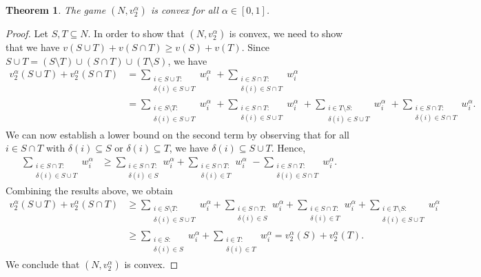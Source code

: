 \documentclass[10p]{article}
\newtheorem{theorem}{Theorem}
\theoremstyle{definition}
\theoremstyle{definition}
\begin{document}
\begin{theorem}%
The game $(N,v_2^\alpha)$ is convex for all $\alpha \in [0,1]$.
\end{theorem}
\begin{proof}
Let $S, T \subseteq N$. In order to show that $(N,v_2^\alpha)$ is convex, we need to show that we have $v(S \cup T) + v(S \cap T) \geq v(S) + v(T)$. Since $S \cup T = (S \setminus T) \cup (S \cap T) \cup (T \setminus S)$, we have
\begin{align*}
    v_2^\alpha(S \cup T) + v_2^\alpha(S \cap T) & = \sum_{\substack{i \in S \cup T : \\ \delta(i) \in S \cup T}}w_i^\alpha \,\, + \sum_{\substack{i \in S \cap T : \\ \delta(i) \in S \cap T}}w_i^\alpha \\
    & = \sum_{\substack{i \in S \setminus T : \\ \delta(i) \in S \cup T}}w_i^\alpha \,\,+ \sum_{\substack{i \in S \cap T : \\ \delta(i) \in S \cup T}}w_i^\alpha \,\,  + \sum_{\substack{i \in T \setminus S : \\ \delta(i) \in S \cup T}}w_i^\alpha \, \, + \sum_{\substack{i \in S \cap T : \\ \delta(i) \in S \cap T}}w_i^\alpha.
\end{align*}
We can now establish a lower bound on the second term by observing that for all $i \in S \cap T$ with $\delta(i) \subseteq S$ or $\delta(i) \subseteq T$, we have $\delta(i) \subseteq S \cup T$. Hence,
\begin{align*}
    \sum_{\substack{i \in S \cap T : \\ \delta(i) \in S \cup T}}w_i^\alpha & \geq \sum_{\substack{i \in S \cap T : \\ \delta(i) \in S}}w_i^\alpha + \sum_{\substack{i \in S \cap T : \\ \delta(i) \in T}}w_i^\alpha \,\, - \sum_{\substack{i \in S \cap T : \\ \delta(i) \in S \cap T}}w_i^\alpha.
\end{align*}
Combining the results above, we obtain
\begin{align*}
    v_2^\alpha(S \cup T) + v_2^\alpha(S \cap T) & \geq \sum_{\substack{i \in S \setminus T : \\ \delta(i) \in S \cup T}}w_i^\alpha + \sum_{\substack{i \in S \cap T : \\ \delta(i) \in S}}w_i^\alpha  + \sum_{\substack{i \in S \cap T : \\ \delta(i) \in T}}w_i^\alpha + \sum_{\substack{i \in T \setminus S : \\ \delta(i) \in S \cup T}}w_i^\alpha \\
    & \geq \sum_{\substack{i \in S : \\ \delta(i) \in S}}w_i^\alpha + \sum_{\substack{i \in T : \\ \delta(i) \in T}}w_i^\alpha = v_2^\alpha(S) + v_2^\alpha(T).
\end{align*}
We conclude that $(N,v_2^\alpha)$ is convex. 
\end{proof}
\end{document}
